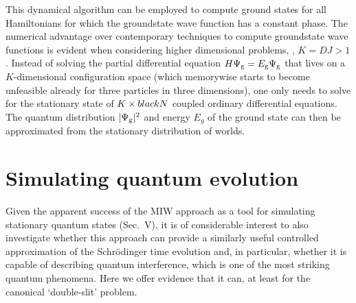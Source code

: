 \documentclass[12pt, aps,pra,amsmath,amssymb,superscriptaddress]{revtex4-2}
\newcommand{\ie}{{\em i.e.}}
\renewcommand{\(}{\left(}
\renewcommand{\)}{\right)}
\newcommand{\blk}{\color{black}}
\begin{document}
 This \blk dynamical algorithm can be employed to compute ground states 
for all Hamiltonians for which the groundstate wave function has a constant phase. 
\blk The numerical advantage over contemporary techniques to compute groundstate
wave functions is
evident when considering higher dimensional problems, \blk \ie, $K=DJ>1$.
Instead of solving the partial differential equation
$H\Psi_{\rm g}=E_{\rm g}\Psi_{\rm g}$ that lives on a 
$K$-dimensional \blk configuration space (which
memorywise starts to become unfeasible already for three particles in three
dimensions), one only needs to solve
for the stationary state of $K\times \blk N$ coupled ordinary differential equations. The
quantum distribution $|\Psi_{\rm g}|^2$ and energy $E_g$ \blk of the ground state can then be
approximated \blk from the stationary \blk distribution of worlds.



\section{Simulating quantum evolution}\label{sec:quantum-evolution}

Given the apparent success of the MIW approach as a tool for simulating
stationary quantum states (Sec.~V), it is of considerable interest to also
investigate whether this approach can  provide \blk a similarly useful
controlled approximation of the Schr\"odinger   time evolution and, in
particular, whether it is capable of describing quantum interference, which is
one of the most striking quantum phenomena. Here we offer evidence 
that it can, at least for the canonical  `double-slit' problem.   
\end{document}

